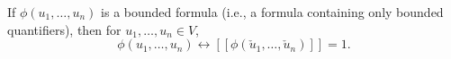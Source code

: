 If $\phi(u_1, \ldots, u_n)$ is a bounded formula (i.e., a formula containing only bounded quantifiers), then for $u_1, \ldots, u_n \in V$,
$$\phi(u_1, \ldots, u_n) \leftrightarrow [\![\phi(\check{u}_1, \ldots, \check{u}_n)]\!] = 1.$$
